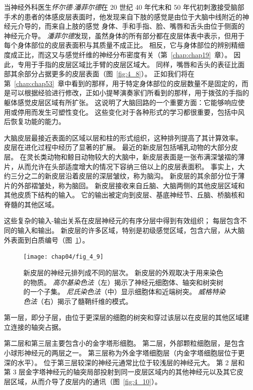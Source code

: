 当神经外科医生\textit{怀尔德$\cdot$潘菲尔德}在 20 世纪 40 年代末和 50 年代初刺激接受脑部手术的患者的体感皮层表面时，他发现来自下肢的感觉是由位于大脑中线附近的神经元介导的，而来自上肢的感觉 身体、手和手指、脸、嘴唇和舌头由位于侧面的神经元介导。 
\textit{潘菲尔德}发现，虽然身体的所有部分都在皮层体表中表示，但用于每个身体部位的皮层表面积与其质量不成正比。 
相反，它与身体部位的辨别精细度成正比，而这又与感觉纤维的神经分布密度有关（第~\ref{chap:chap19}~章）。 
因此，专用于手指的皮层区域比手臂的皮层区域大。 
同样，嘴唇和舌头的表征比面部其余部分占据更多的皮层表面（图~\ref{fig:4_8}）。
正如我们将在第~\ref{chap:chap53}~章中看到的那样，用于特定身体部位的皮层数量不是固定的，而是可以根据经验进行修改，正如小提琴演奏家们所看到的那样，用于拨弦的手指的躯体感觉皮层区域有所扩张。
这说明了大脑回路的一个重要方面：它能够响应使用或停用而发生可塑性变化。
这些变化对于各种形式的学习都很重要，包括中风后恢复功能的能力。


大脑皮层最接近表面的区域以层和柱的形式组织，这种排列提高了其计算效率。 
皮层在进化过程中经历了显著的扩展。 
最近的新皮层包括哺乳动物的大部分皮层。 
在灵长类动物和鲸目动物较大的大脑中，新皮层表面是一张布满深皱褶的薄片，从而允许在头部适度增大的情况下容纳三倍以上的皮层表面积。 
事实上，大约三分之二的新皮层沿着皮层的深层皱纹，称为脑沟。 
新皮层的其余部分位于薄片的外部褶皱处，称为脑回。 
新皮层接收来自丘脑、大脑两侧的其他皮层区域和其他皮质下结构的输入。 
它的输出被定向到皮层、基底神经节、丘脑、桥脑核和脊髓的其他区域。


这些复杂的输入-输出关系在皮层神经元的有序分层中得到有效组织； 每层包含不同的输入和输出。 
新皮层的许多区域，特别是初级感觉区域，包含六层，从大脑外表面到白质编号（图~\ref{fig:4_9}）。

\begin{figure}[htbp]
	\centering
	\texttt{[image: chap04/fig\_4\_9]}
	\caption{新皮层的神经元排列成不同的层次。 
		新皮层的外观取决于用来染色的物质。 
		\textit{高尔基染色法}（左）揭示了神经元细胞体、轴突和树突树的一个子集。 
		\textit{尼氏染色法}（中）显示细胞体和近端树突。
		\textit{威格特染色法}（右）揭示了髓鞘纤维的模式\cite{heimer2012human}。}
	\label{fig:4_9}
\end{figure}


第一层，即分子层，由位于更深层的细胞的树突和穿过该层以在皮层的其他区域建立连接的轴突占据。


第二层和第三层主要包含小的金字塔形细胞。 
第二层，外部颗粒细胞层，是包含小球形神经元的两层之一。 
第三层称为外金字塔细胞层（内金字塔细胞层位于更深的水平）。 
位于第三层较深的神经元通常比位于较浅层的神经元大。 
第 2 层和第 3 层金字塔神经元的轴突局部投射到同一皮层区域内的其他神经元以及其它皮层区域，从而介导了皮层内的通讯（图~\ref{fig:4_10}）。

